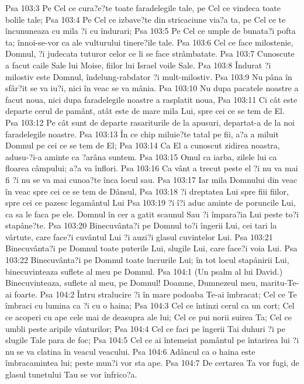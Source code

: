 Psa 103:3  Pe Cel ce cura?e?te toate faradelegile tale, pe Cel ce vindeca toate bolile tale;
Psa 103:4  Pe Cel ce izbave?te din stricaciune via?a ta, pe Cel ce te încununeaza cu mila ?i cu îndurari;
Psa 103:5  Pe Cel ce umple de bunata?i pofta ta; înnoi-se-vor ca ale vulturului tinere?ile tale.
Psa 103:6  Cel ce face milostenie, Domnul, ?i judecata tuturor celor ce li se face strâmbatate.
Psa 103:7  Cunoscute a facut caile Sale lui Moise, fiilor lui Israel voile Sale.
Psa 103:8  Îndurat ?i milostiv este Domnul, îndelung-rabdator ?i mult-milostiv.
Psa 103:9  Nu pâna în sfâr?it se va iu?i, nici în veac se va mânia.
Psa 103:10  Nu dupa pacatele noastre a facut noua, nici dupa faradelegile noastre a rasplatit noua,
Psa 103:11  Ci cât este departe cerul de pamânt, atât este de mare mila Lui, spre cei ce se tem de El.
Psa 103:12  Pe cât sunt de departe rasariturile de la apusuri, departat-a de la noi faradelegile noastre.
Psa 103:13  În ce chip miluie?te tatal pe fii, a?a a miluit Domnul pe cei ce se tem de El;
Psa 103:14  Ca El a cunoscut zidirea noastra, adusu-?i-a aminte ca ?arâna suntem.
Psa 103:15  Omul ca iarba, zilele lui ca floarea câmpului; a?a va înflori.
Psa 103:16  Ca vânt a trecut peste el ?i nu va mai fi ?i nu se va mai cunoa?te înca locul sau.
Psa 103:17  Iar mila Domnului din veac în veac spre cei ce se tem de Dânsul,
Psa 103:18  ?i dreptatea Lui spre fiii fiilor, spre cei ce pazesc legamântul Lui
Psa 103:19  ?i î?i aduc aminte de poruncile Lui, ca sa le faca pe ele. Domnul în cer a gatit scaunul Sau ?i împara?ia Lui peste to?i stapâne?te.
Psa 103:20  Binecuvânta?i pe Domnul to?i îngerii Lui, cei tari la vârtute, care face?i cuvântul Lui ?i auzi?i glasul cuvintelor Lui.
Psa 103:21  Binecuvânta?i pe Domnul toate puterile Lui, slugile Lui, care face?i voia Lui.
Psa 103:22  Binecuvânta?i pe Domnul toate lucrurile Lui; în tot locul stapânirii Lui, binecuvinteaza suflete al meu pe Domnul.
Psa 104:1  (Un psalm al lui David.) Binecuvinteaza, suflete al meu, pe Domnul! Doamne, Dumnezeul meu, maritu-Te-ai foarte.
Psa 104:2  Întru stralucire ?i în mare podoaba Te-ai îmbracat; Cel ce Te îmbraci cu lumina ca ?i cu o haina;
Psa 104:3  Cel ce întinzi cerul ca un cort; Cel ce acoperi cu ape cele mai de deasupra ale lui; Cel ce pui norii suirea Ta; Cel ce umbli peste aripile vânturilor;
Psa 104:4  Cel ce faci pe îngerii Tai duhuri ?i pe slugile Tale para de foc;
Psa 104:5  Cel ce ai întemeiat pamântul pe întarirea lui ?i nu se va clatina în veacul veacului.
Psa 104:6  Adâncul ca o haina este îmbracamintea lui; peste mun?i vor sta ape.
Psa 104:7  De certarea Ta vor fugi, de glasul tunetului Tau se vor înfrico?a.
